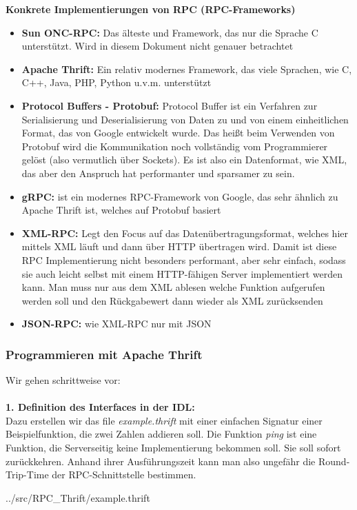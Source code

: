 \textbf{Konkrete Implementierungen von RPC (RPC-Frameworks)}\\
\begin{itemize}
    \item \textbf{Sun ONC-RPC:} Das älteste und  Framework, das nur die Sprache C unterstützt. Wird in diesem Dokument nicht genauer betrachtet
    \item \textbf{Apache Thrift:} Ein relativ modernes Framework, das viele Sprachen, wie C, C++, Java, PHP, Python u.v.m. unterstützt
    \item \textbf{Protocol Buffers - Protobuf:} Protocol Buffer ist ein Verfahren zur Serialisierung und Deserialisierung von Daten zu und von einem einheitlichen Format, das von Google entwickelt wurde. Das heißt beim Verwenden von Protobuf wird die Kommunikation noch vollständig vom Programmierer gelöst (also vermutlich über Sockets). Es ist also ein Datenformat, wie XML, das aber den Anspruch hat performanter und sparsamer zu sein.
    \item \textbf{gRPC:} ist ein modernes RPC-Framework von Google, das sehr ähnlich zu Apache Thrift ist, welches auf Protobuf basiert
    \item \textbf{XML-RPC:} Legt den Focus auf das Datenübertragungsformat, welches hier mittels XML läuft und dann über HTTP übertragen wird. Damit ist diese RPC Implementierung nicht besonders performant, aber sehr einfach, sodass sie auch leicht selbst mit einem HTTP-fähigen Server implementiert werden kann. Man muss nur aus dem XML ablesen welche Funktion aufgerufen werden soll und den Rückgabewert dann wieder als XML zurücksenden
    \item \textbf{JSON-RPC: } wie XML-RPC nur mit JSON
\end{itemize}

\subsubsection{Programmieren mit Apache Thrift}


Wir gehen schrittweise vor:\\
\\
\textbf{1. Definition des Interfaces in der IDL:}\\
Dazu erstellen wir das file \textit{example.thrift} mit einer einfachen Signatur einer Beispielfunktion, die zwei Zahlen addieren soll. Die Funktion \textit{ping} ist eine Funktion, die Serverseitig keine Implementierung bekommen soll. Sie soll sofort zurückkehren. Anhand ihrer Ausführungszeit kann man also ungefähr die Round-Trip-Time der RPC-Schnittstelle bestimmen.
\begin{lstinputlisting}[]
    {../src/RPC_Thrift/example.thrift}
\end{lstinputlisting}

